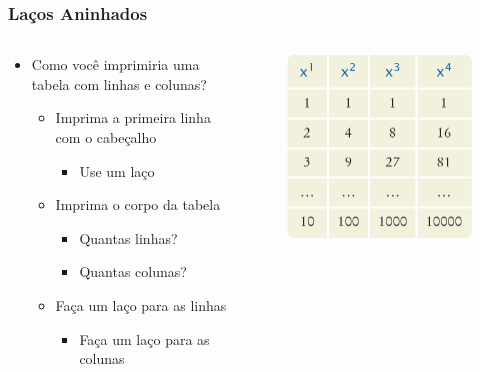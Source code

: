 \documentclass[xcolor={dvipsnames,table},aspectratio=169]{beamer}
\begin{document}
\begin{frame}\frametitle{Laços Aninhados}
\begin{columns}[T]
	\begin{column}{0.5\linewidth}
\begin{itemize}
	\item Como você imprimiria uma tabela com linhas e colunas?
	\begin{itemize}
		\item Imprima a primeira linha com o cabeçalho
		\begin{itemize}
			\item Use um laço
		\end{itemize}
		\item Imprima o corpo da tabela
		\begin{itemize}
			\item Quantas linhas?
			\item Quantas colunas?
		\end{itemize}
		\item Faça um laço para as linhas
		\begin{itemize}
			\item Faça um laço para as colunas
		\end{itemize}
	\end{itemize}
\end{itemize}
	\end{column}
	\begin{column}{0.5\linewidth}
\begin{figure}[h]
	\includegraphics[height=0.5\paperheight,center]{pucrs-ep-fprog-unidade_04-lacos-laminas-tabela.png}
\end{figure}
	\end{column}
\end{columns}
\end{frame}
\end{document}
